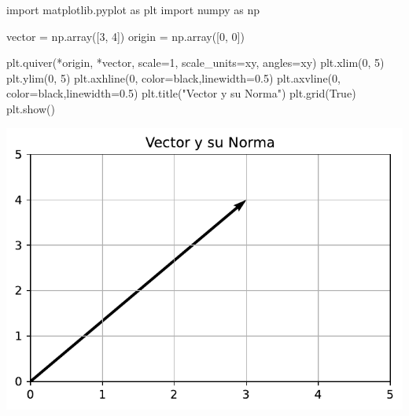 \documentclass[
  letterpaper,
  DIV=11,
  numbers=noendperiod]{scrartcl}
\newenvironment{Shaded}{\begin{snugshade}}{\end{snugshade}}
\newcommand{\DecValTok}[1]{\textcolor[rgb]{0.68,0.00,0.00}{#1}}
\newcommand{\FloatTok}[1]{\textcolor[rgb]{0.68,0.00,0.00}{#1}}
\newcommand{\ImportTok}[1]{\textcolor[rgb]{0.00,0.46,0.62}{#1}}
\newcommand{\NormalTok}[1]{\textcolor[rgb]{0.00,0.23,0.31}{#1}}
\newcommand{\OperatorTok}[1]{\textcolor[rgb]{0.37,0.37,0.37}{#1}}
\newcommand{\StringTok}[1]{\textcolor[rgb]{0.13,0.47,0.30}{#1}}
\newcommand{\VariableTok}[1]{\textcolor[rgb]{0.07,0.07,0.07}{#1}}
\begin{document}
\begin{Shaded}
\begin{Highlighting}[]
\ImportTok{import}\NormalTok{ matplotlib.pyplot }\ImportTok{as}\NormalTok{ plt}
\ImportTok{import}\NormalTok{ numpy }\ImportTok{as}\NormalTok{ np}

\NormalTok{vector }\OperatorTok{=}\NormalTok{ np.array([}\DecValTok{3}\NormalTok{, }\DecValTok{4}\NormalTok{])}
\NormalTok{origin }\OperatorTok{=}\NormalTok{ np.array([}\DecValTok{0}\NormalTok{, }\DecValTok{0}\NormalTok{])}

\NormalTok{plt.quiver(}\OperatorTok{*}\NormalTok{origin, }\OperatorTok{*}\NormalTok{vector, scale}\OperatorTok{=}\DecValTok{1}\NormalTok{, scale\_units}\OperatorTok{=}\StringTok{\textquotesingle{}xy\textquotesingle{}}\NormalTok{, angles}\OperatorTok{=}\StringTok{\textquotesingle{}xy\textquotesingle{}}\NormalTok{)}
\NormalTok{plt.xlim(}\DecValTok{0}\NormalTok{, }\DecValTok{5}\NormalTok{)}
\NormalTok{plt.ylim(}\DecValTok{0}\NormalTok{, }\DecValTok{5}\NormalTok{)}
\NormalTok{plt.axhline(}\DecValTok{0}\NormalTok{, color}\OperatorTok{=}\StringTok{\textquotesingle{}black\textquotesingle{}}\NormalTok{,linewidth}\OperatorTok{=}\FloatTok{0.5}\NormalTok{)}
\NormalTok{plt.axvline(}\DecValTok{0}\NormalTok{, color}\OperatorTok{=}\StringTok{\textquotesingle{}black\textquotesingle{}}\NormalTok{,linewidth}\OperatorTok{=}\FloatTok{0.5}\NormalTok{)}
\NormalTok{plt.title(}\StringTok{"Vector y su Norma"}\NormalTok{)}
\NormalTok{plt.grid(}\VariableTok{True}\NormalTok{)}
\NormalTok{plt.show()}
\end{Highlighting}
\end{Shaded}

\includegraphics{presentacion_files/figure-pdf/cell-2-output-1.pdf}
\end{document}
